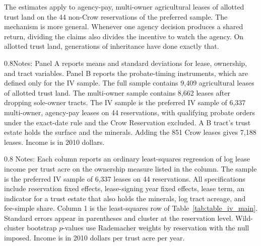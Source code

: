\documentclass[12pt]{article}
\makeatletter
\let\estinput=\@@input %
\newcommand{\estwide}[3]{
		\vspace{.75ex}{
			\begin{tabular*}
			{\textwidth}{@{\hskip\tabcolsep\extracolsep\fill}l*{#2}{#3}}
			\toprule
			\estinput{#1}
			\bottomrule
			\addlinespace[.75ex]
			\end{tabular*}
			}
		}
\makeatother
\begin{document}
The estimates apply to agency-pay, multi-owner agricultural leases of allotted trust land on the 44 non-Crow reservations of the preferred sample. The mechanism is more general. Whenever one agency decision produces a shared return, dividing the claims also divides the incentive to watch the agency. On allotted trust land, generations of inheritance have done exactly that.

\clearpage




\clearpage

\begin{table}[H]
\caption{Summary Statistics for Lease-Level Variables} \label{tab:table1}
\footnotesize
\setlength\extrarowheight{-6pt}
\estwide{table1.tex}{6}{c}
\parbox{1\textwidth}{\begin{spacing}{0.8}\small\noindent Notes: Panel A reports means and standard deviations for lease, ownership, and tract variables. Panel B reports the probate-timing instruments, which are defined only for the IV sample. The full sample contains 9,409 agricultural leases of allotted trust land. The multi-owner sample contains 8,662 leases after dropping sole-owner tracts. The IV sample is the preferred IV sample of 6,337 multi-owner, agency-pay leases on 44 reservations, with qualifying probate orders under the exact-date rule and the Crow Reservation excluded. A B tract's trust estate holds the surface and the minerals. Adding the 851 Crow leases gives 7,188 leases. Income is in 2010 dollars.\end{spacing}}
\normalsize
\end{table}

\begin{table}[H]
\caption{Descriptive Ownership Fractionation and Lease Income per Trust Acre}
\label{tab:frac_compact}
\setlength\extrarowheight{-6pt}
\begingroup
\setlength{\tabcolsep}{4pt}
\estwide{table_frac_compact.tex}{5}{c}
\endgroup
\parbox{1\textwidth}{\begin{spacing}{0.8}
\small\noindent Notes: Each column reports an ordinary least-squares regression of log lease income per trust acre on the ownership measure listed in the column. The sample is the preferred IV sample of 6,337 leases on 44 reservations. All specifications include reservation fixed effects, lease-signing year fixed effects, lease term, an indicator for a trust estate that also holds the minerals, log tract acreage, and fee-simple share. Column 1 is the least-squares row of Table~\ref{tab:table_iv_main}. Standard errors appear in parentheses and cluster at the reservation level. Wild-cluster bootstrap $p$-values use Rademacher weights by reservation with the null imposed. Income is in 2010 dollars per trust acre per year.
\end{spacing}}
\end{table}
\end{document}

